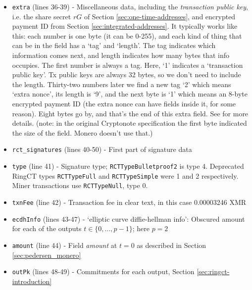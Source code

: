 \begin{appendices}
\begin{itemize}
	\item {\tt extra} (lines 36-39) - Miscellaneous data, including the {\em transaction public key}, i.e. the share secret $r G$ of Section  \ref{sec:one-time-addresses}, and encrypted payment ID from Section \ref{sec:integrated-addresses}. It typically works like this: each number is one byte (it can be 0-255), and each kind of thing that can be in the field has a `tag' and `length'. The tag indicates which information comes next, and length indicates how many bytes that info occupies. The first number is always a tag. Here, `1' indicates a `transaction public key'. Tx public keys are always 32 bytes, so we don't need to include the length. Thirty-two numbers later we find a new tag `2' which means `extra nonce', its length is `9', and the next byte is `1' which means an 8-byte encrypted payment ID (the extra nonce can have fields inside it, for some reason). Eight bytes go by, and that's the end of this extra field. See \cite{extra-field-stackexchange} for more details. (note: in the original Cryptonote specification the first byte indicated the size of the field. Monero doesn't use that.) \cite{tx-extra-field}
	\item {\tt rct\_signatures} (lines 40-50) - First part of signature data
	\item {\tt type} (line 41) - Signature type; {\tt RCTTypeBulletproof2} is type 4. Deprecated RingCT types {\tt RCTTypeFull} and {\tt RCTTypeSimple} were 1 and 2 respectively. Miner transactions use {\tt RCTTypeNull}, type 0.
	\item {\tt txnFee} (line 42) - Transaction fee in clear text, in this case 0.00003246 XMR
	\item {\tt ecdhInfo} (lines 43-47) - ‘elliptic curve diffie-hellman info’: Obscured amount for each of the outputs $t \in \{0, ..., p-1\}$; here $p = 2$
    \item {\tt amount} (line 44) - Field {\sl amount} at $t = 0$ as described in Section \ref{sec:pedersen_monero}
    \item {\tt outPk} (lines 48-49) - Commitments for each output, Section \ref{sec:ringct-introduction}


\end{itemize}
\end{appendices}
